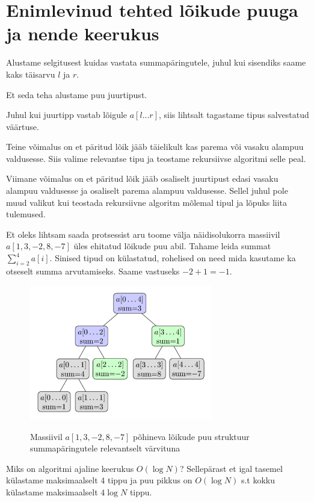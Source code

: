 \documentclass{trkut}
\begin{document}
\section{Enimlevinud tehted lõikude puuga ja nende keerukus}
Alustame selgitusest kuidas vastata summapäringutele, juhul kui sisendiks saame kaks täisarvu $l$ ja $r$.

Et seda teha alustame puu juurtipust. 

Juhul kui juurtipp vastab lõigule $a[l...r]$, siis lihtsalt tagastame tipus salvestatud väärtuse. \parencite{EMaxx}

Teine võimalus on et päritud lõik jääb täielikult kas parema või vasaku alampuu valdusesse. Siis valime relevantse tipu ja teostame rekursiivse algoritmi selle peal. \parencite{EMaxx}

Viimane võimalus on et päritud lõik jääb osaliselt juurtipust edasi vasaku alampuu valdusesse ja osaliselt parema alampuu valdusesse. Sellel juhul pole muud valikut kui teostada rekursiivne algoritm mõlemal tipul ja lõpuks liita tulemused. \parencite{EMaxx}

Et oleks lihtsam saada protsessist aru toome välja näidisolukorra massiivil $a[1,3,-2,8,-7]$ üles ehitatud lõikude puu abil. 
Tahame leida summat $\sum_{i=2}^{4} {a[i]}$.
Sinised tipud on külastatud, rohelised on need mida kasutame ka otseselt summa arvutamiseks.
Saame vastuseks $-2+1=-1$. \parencite{EMaxx}

\begin{figure}[H]%
    \includegraphics[width=8cm]{SLPUU.png}%
    \caption{Massiivil $a[1,3,-2,8,-7]$ põhineva lõikude puu struktuur summapäringutele relevantselt värvituna}%
    \label{joonislol}%
\end{figure}

Miks on algoritmi ajaline keerukus $O(\log N)$? Sellepärast et igal tasemel külastame maksimaalselt $4$ tippu ja puu pikkus on $O(\log N)$ s.t kokku külastame maksimaalselt $4\log N$ tippu. \parencite{EMaxx}
\end{document}
